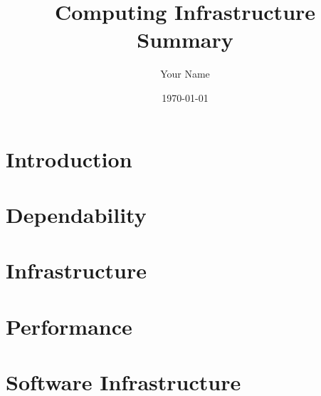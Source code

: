 \documentclass{article}
\title{Computing Infrastructure Summary}
\author{Your Name}
\date{\today}
\begin{document}
\maketitle

\tableofcontents
\newpage

\part{Introduction}


\part{Dependability}



\part{Infrastructure}












\part{Performance}




\part{Software Infrastructure}



\end{document}
